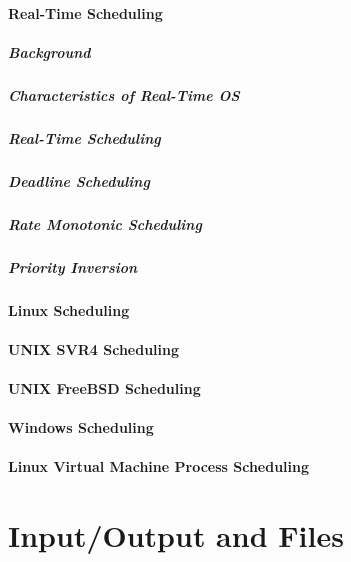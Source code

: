 \subsection{Real-Time Scheduling}
\subsubsection{Background}
\subsubsection{Characteristics of Real-Time OS}
\subsubsection{Real-Time Scheduling}
\subsubsection{Deadline Scheduling}
\subsubsection{Rate Monotonic Scheduling}
\subsubsection{Priority Inversion}
\subsection{Linux Scheduling}
\subsection{UNIX SVR4 Scheduling}
\subsection{UNIX FreeBSD Scheduling}
\subsection{Windows Scheduling}
\subsection{Linux Virtual Machine Process Scheduling}


\newpage
\part{Input/Output and Files}


